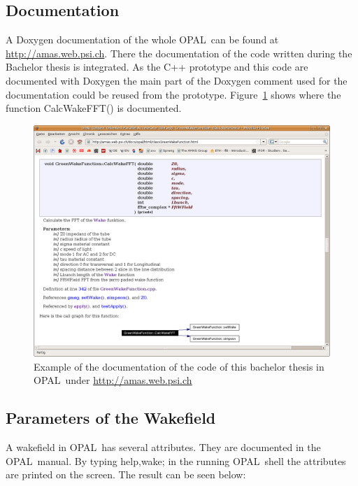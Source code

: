 \documentclass[11pt,a4paper]{article}
\newcommand{\opal}{\textsc{OPAL}}
\begin{document}
\subsection{Documentation}
A Doxygen documentation of the whole \opal\ can be found at 
\url{http://amas.web.psi.ch}. There the documentation of the code written during the Bachelor thesis is integrated. As the C++ prototype and this code are documented with Doxygen the main part of the Doxygen comment used for the documentation could be reused from the prototype. Figure~\ref{fig:OPAL_doc} shows where the function CalcWakeFFT() is documented.
\begin{figure}[htb]
\begin{center}
\includegraphics[width=1\textwidth]{codDoc/Opal_doc.png}
\caption{Example of the documentation of the code of this bachelor thesis in \opal\ under 
\url{http://amas.web.psi.ch}   \label{fig:OPAL_doc} }
\end{center}
\end{figure}


\clearpage


\subsection{Parameters of the Wakefield}
A wakefield in \opal\ has several attributes. They are documented in the \opal\ manual. By typing help,wake; in the running \opal\ shell the attributes are printed on the screen. The result can be seen below:
\end{document}
